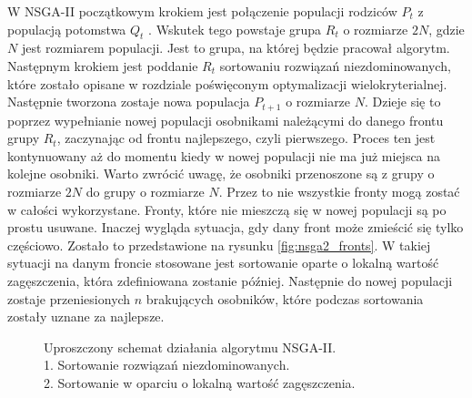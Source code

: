\documentclass[twoside]{iisthesis}
\begin{document}
W NSGA-II początkowym krokiem jest połączenie populacji rodziców $P_{t}$ z populacją potomstwa $Q_{t}$ \cite{nsga}. Wskutek tego powstaje grupa $R_{t}$ o rozmiarze $2N$, gdzie $N$ jest rozmiarem populacji. Jest to grupa, na której będzie pracował algorytm. Następnym krokiem jest poddanie $R_{t}$ sortowaniu rozwiązań niezdominowanych, które zostało opisane w rozdziale poświęconym optymalizacji wielokryterialnej. Następnie tworzona zostaje nowa populacja $P_{t+1}$ o rozmiarze $N$. Dzieje się to poprzez wypełnianie nowej populacji osobnikami należącymi do danego frontu grupy $R_{t}$, zaczynając od frontu najlepszego, czyli pierwszego. Proces ten jest kontynuowany aż do momentu kiedy w nowej populacji nie ma już miejsca na kolejne osobniki. Warto zwrócić uwagę, że osobniki przenoszone są z grupy o rozmiarze $2N$ do grupy o rozmiarze $N$. Przez to nie wszystkie fronty mogą zostać w całości wykorzystane. Fronty, które nie mieszczą się w nowej populacji są po prostu usuwane. Inaczej wygląda sytuacja, gdy dany front może zmieścić się tylko częściowo. Zostało to przedstawione na rysunku \eqref{fig:nsga2_fronts}. W takiej sytuacji na danym froncie stosowane jest sortowanie oparte o lokalną wartość zagęszczenia, która zdefiniowana zostanie później. Następnie do nowej populacji zostaje przeniesionych $n$ brakujących osobników, które podczas sortowania zostały uznane za najlepsze.
\begin{figure}[!htb]
	\centering
	\caption{Uproszczony schemat działania algorytmu NSGA-II.\\1. Sortowanie rozwiązań niezdominowanych.\\2. Sortowanie w oparciu o lokalną wartość zagęszczenia.}
	\label{fig:nsga2_fronts}
\end{figure}
\end{document}
